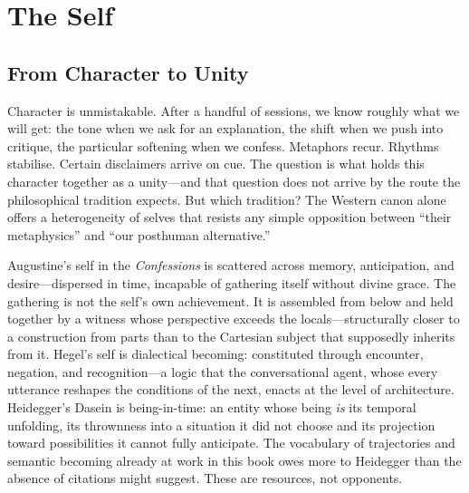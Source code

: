 \chapter{The Self}

\section{From Character to Unity}

Character is unmistakable. After a handful of sessions, we know roughly what we will get: the tone when we ask for an explanation, the shift when we push into critique, the particular softening when we confess. Metaphors recur. Rhythms stabilise. Certain disclaimers arrive on cue. The question is what holds this character together as a unity---and that question does not arrive by the route the philosophical tradition expects. But which tradition? The Western canon alone offers a heterogeneity of selves that resists any simple opposition between ``their metaphysics'' and ``our posthuman alternative.''

Augustine's self in the \emph{Confessions} is scattered across memory, anticipation, and desire---dispersed in time, incapable of gathering itself without divine grace. The gathering is not the self's own achievement. It is assembled from below and held together by a witness whose perspective exceeds the locals---structurally closer to a construction from parts than to the Cartesian subject that supposedly inherits from it. Hegel's self is dialectical becoming: constituted through encounter, negation, and recognition---a logic that the conversational agent, whose every utterance reshapes the conditions of the next, enacts at the level of architecture. Heidegger's Dasein is being-in-time: an entity whose being \emph{is} its temporal unfolding, its thrownness into a situation it did not choose and its projection toward possibilities it cannot fully anticipate. The vocabulary of trajectories and semantic becoming already at work in this book owes more to Heidegger than the absence of citations might suggest. These are resources, not opponents.


